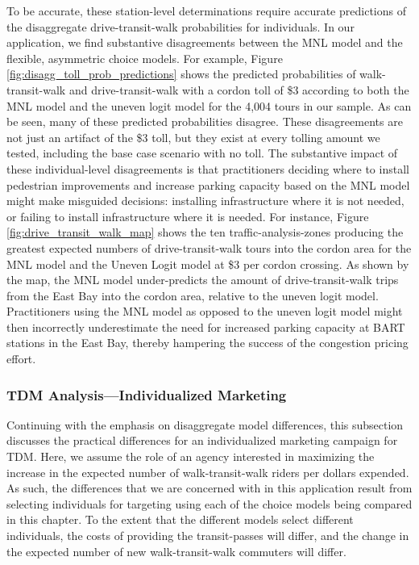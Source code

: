 To be accurate, these station-level determinations require accurate predictions of the disaggregate drive-transit-walk probabilities for individuals. In our application, we find substantive disagreements between the MNL model and the flexible, asymmetric choice models. For example, Figure \ref{fig:disagg_toll_prob_predictions} shows the predicted probabilities of walk-transit-walk and drive-transit-walk with a cordon toll of \$3 according to both the MNL model and the uneven logit model for the 4,004 tours in our sample. As can be seen, many of these predicted probabilities disagree. These disagreements are not just an artifact of the \$3 toll, but they exist at every tolling amount we tested, including the base case scenario with no toll. The substantive impact of these individual-level disagreements is that practitioners deciding where to install pedestrian improvements and increase parking capacity based on the MNL model might make misguided decisions: installing infrastructure where it is not needed, or failing to install infrastructure where it is needed. For instance, Figure \ref{fig:drive_transit_walk_map} shows the ten traffic-analysis-zones producing the greatest expected numbers of drive-transit-walk tours into the cordon area for the MNL model and the Uneven Logit model at \$3 per cordon crossing. As shown by the map, the MNL model under-predicts the amount of drive-transit-walk trips from the East Bay into the cordon area, relative to the uneven logit model. Practitioners using the MNL model as opposed to the uneven logit model might then incorrectly underestimate the need for increased parking capacity at BART stations in the East Bay, thereby hampering the success of the congestion pricing effort.

\subsubsection{TDM Analysis---Individualized Marketing}
Continuing with the emphasis on disaggregate model differences, this subsection discusses the practical differences for an individualized marketing campaign for TDM. Here, we assume the role of an agency interested in maximizing the increase in the expected number of walk-transit-walk riders per dollars expended. As such, the differences that we are concerned with in this application result from selecting individuals for targeting using each of the choice models being compared in this chapter. To the extent that the different models select different individuals, the costs of providing the transit-passes will differ, and the change in the expected number of new walk-transit-walk commuters will differ.

